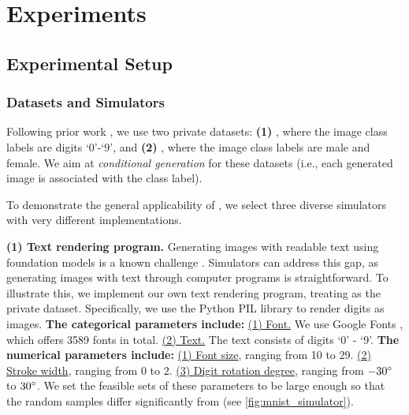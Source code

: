 \section{Experiments}
\label{sec:exp}

\subsection{Experimental Setup}

\subsubsection{Datasets and Simulators}
\label{sec:datasets_and_simulators}

 Following prior work \cite{dpimagebench}, we use two private datasets: \textbf{(1) \mnist{}} \cite{lecun1998mnist}, where the image class labels are digits `0'-`9', and \textbf{(2) \celeba{}} \cite{liu2015faceattributes}, where the image class labels are male and female. We aim at \emph{conditional generation} for these datasets (i.e., each generated image is associated with the class label).

To demonstrate the general applicability of \simpe{}, we select three diverse simulators with very different implementations.


\noindent\textbf{(1) Text rendering program.} Generating images with readable text using foundation models is a known challenge \cite{betker2023improving}. Simulators can address this gap, as generating images with text through computer programs is straightforward. To illustrate this, we implement our own text rendering program, treating \mnist{} as the private dataset. Specifically, we use the Python PIL library to render digits as images.
\textbf{The categorical parameters include:}
\underline{(1) Font.} We use Google Fonts \cite{googlefonts}, which offers 3589 fonts in total.
\underline{(2) Text.} The text consists of digits `0' - `9'. %
\textbf{The numerical parameters include:}
\underline{(1) Font size}, ranging from 10 to 29.
\underline{(2) Stroke width}, ranging from 0 to 2.
\underline{(3) Digit rotation degree}, ranging from $-30\degree$ to $30\degree$. We set the feasible sets of these parameters to be large enough so that the random samples differ significantly from \mnist{} (see \cref{fig:mnist_simulator}).

